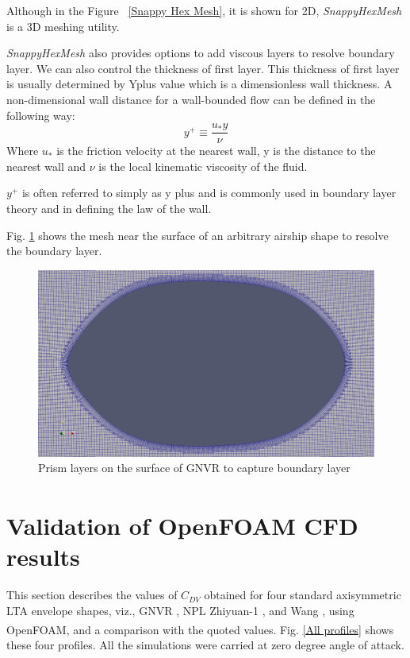 Although in the Figure ~\ref{Snappy Hex Mesh}, it is shown for 2D, \textit{SnappyHexMesh} is a 3D meshing utility.

\textit{SnappyHexMesh} also provides options to add viscous layers to resolve boundary layer. We can also control the thickness of first layer. This thickness of first layer is usually determined by Yplus value which is a dimensionless wall thickness.
A non-dimensional wall distance for a wall-bounded flow can be defined in the following way:
\begin{equation}
y^{+} \equiv \dfrac{u_{*} y}{\nu}
\end{equation}
Where $ u_{*} $ is the friction velocity at the nearest wall, y is the distance to the nearest wall and $ \nu $ is the local kinematic viscosity of the fluid.

$ y^+ $ is often referred to simply as y plus and is commonly used in boundary layer theory and in defining the law of the wall.

Fig. \ref{prismlayers} shows the mesh near the surface of an arbitrary airship shape to resolve the boundary layer.
\begin{figure}[H]
	\centering
	\includegraphics[width=300 pt]{rnd/viscous_layers.png}
	\caption{Prism layers on the surface of GNVR to capture boundary layer}
	\label{prismlayers} %
\end{figure}

\section{Validation of OpenFOAM\textsuperscript{\textregistered} CFD results}
\label{results}

This section describes the values of $C_{DV}$ obtained for four standard axisymmetric LTA envelope shapes, viz., GNVR \cite{Ram2010}, NPL \cite{cheeseman1999} Zhiyuan-1 \cite{Wang2010}, and Wang \cite{Wang2009}, using OpenFOAM\textsuperscript{\textregistered}, and a comparison with the quoted values. 
Fig. \ref{All profiles} shows these four profiles. All the simulations were carried at zero degree angle of attack.

